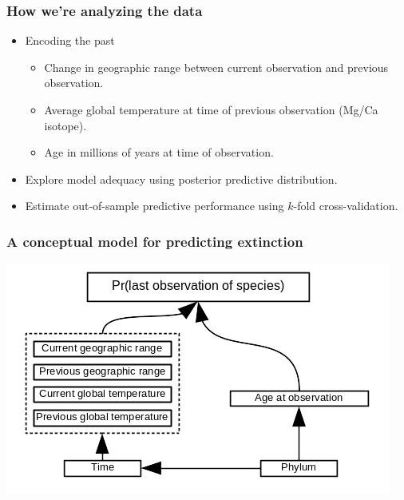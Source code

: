 \documentclass{beamer}
\begin{document}
\begin{frame}
  \frametitle{How we're analyzing the data}

  \begin{itemize}%
    \item Encoding the past
      \begin{itemize}
        \item Change in geographic range between current observation and previous observation.
        \item Average global temperature at time of previous observation (Mg/Ca isotope).
        \item Age in millions of years at time of observation.
      \end{itemize}
    \item Explore model adequacy using posterior predictive distribution.
    \item Estimate out-of-sample predictive performance using \(k\)-fold cross-validation.
  \end{itemize}

\end{frame}


\begin{frame}
  \frametitle{A conceptual model for predicting extinction}
      
  \begin{center}
    \includegraphics[width=\textwidth,height=\textheight,keepaspectratio=true]{figure/conceptual_diagram}
  \end{center}

\end{frame}
\end{document}
